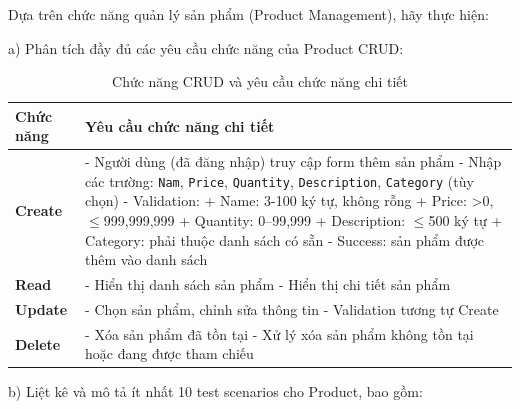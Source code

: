 \documentclass[a4paper,12pt]{article}
\begin{document}
Dựa trên chức năng quản lý sản phẩm (Product Management), hãy thực hiện:

a) Phân tích đầy đủ các yêu cầu chức năng của Product CRUD:
\begin{table}[H]
\centering
\begin{tabular}{|p{3.5cm}|p{10.2cm}|}
\hline
\textbf{Chức năng} & \textbf{Yêu cầu chức năng chi tiết} \\ \hline

\textbf{Create} &
- Người dùng (đã đăng nhập) truy cập form thêm sản phẩm \newline
- Nhập các trường: \texttt{Nam}, \texttt{Price}, \texttt{Quantity}, \texttt{Description}, \texttt{Category} (tùy chọn) \newline
- Validation: \newline
    + Name: 3-100 ký tự, không rỗng \newline
    + Price: >0, $\leq$999,999,999 \newline
    + Quantity: 0–99,999 \newline
    + Description: $\leq$500 ký tự \newline
    + Category: phải thuộc danh sách có sẵn \newline
- Success: sản phẩm được thêm vào danh sách \\ \hline

\textbf{Read} &
- Hiển thị danh sách sản phẩm \newline
- Hiển thị chi tiết sản phẩm \\ \hline

\textbf{Update} &
- Chọn sản phẩm, chỉnh sửa thông tin \newline
- Validation tương tự Create\\ \hline

\textbf{Delete} &
- Xóa sản phẩm đã tồn tại \newline
- Xử lý xóa sản phẩm không tồn tại hoặc đang được tham chiếu\\ \hline

\end{tabular}
\caption{ Chức năng CRUD và yêu cầu chức năng chi tiết}
\end{table}
b) Liệt kê và mô tả ít nhất 10 test scenarios cho Product, bao gồm:
\end{document}
